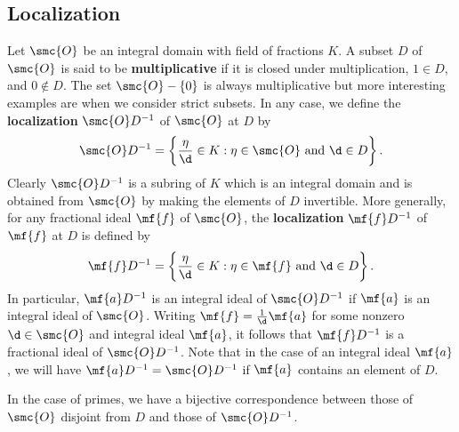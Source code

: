 \documentclass[12pt]{article}
\begin{document}
    \subsection{Localization}
      Let \(\smc{O}\) be an integral domain with field of fractions \(K\). A subset \(D\) of \(\smc{O}\) is said to be \textbf{multiplicative} if it is closed under multiplication, \(1 \in D\), and \(0 \notin D\). The set \(\smc{O}-\{0\}\) is always multiplicative but more interesting examples are when we consider strict subsets. In any case, we define the \textbf{localization} \(\smc{O}D^{-1}\) of \(\smc{O}\) at \(D\) by
      \[
        \smc{O}D^{-1} = \left\{\frac{\eta}{\d} \in K:\eta \in \smc{O} \text{ and } \d \in D\right\}.
      \]
      Clearly \(\smc{O}D^{-1}\) is a subring of \(K\) which is an integral domain and is obtained from \(\smc{O}\) by making the elements of \(D\) invertible. More generally, for any fractional ideal \(\mf{f}\) of \(\smc{O}\), the \textbf{localization} \(\mf{f}D^{-1}\) of \(\mf{f}\) at \(D\) is defined by
      \[
        \mf{f}D^{-1} = \left\{\frac{\eta}{\d} \in K:\eta \in \mf{f} \text{ and } \d \in D\right\}.
      \]
      In particular, \(\mf{a}D^{-1}\) is an integral ideal of \(\smc{O}D^{-1}\) if \(\mf{a}\) is an integral ideal of \(\smc{O}\). Writing \(\mf{f} = \frac{1}{\d}\mf{a}\) for some nonzero \(\d \in \smc{O}\) and integral ideal \(\mf{a}\), it follows that \(\mf{f}D^{-1}\) is a fractional ideal of \(\smc{O}D^{-1}\). Note that in the case of an integral ideal \(\mf{a}\), we will have \(\mf{a}D^{-1} = \smc{O}D^{-1}\) if \(\mf{a}\) contains an element of \(D\).
      
      In the case of primes, we have a bijective correspondence between those of \(\smc{O}\) disjoint from \(D\) and those of \(\smc{O}D^{-1}\).
\end{document}
